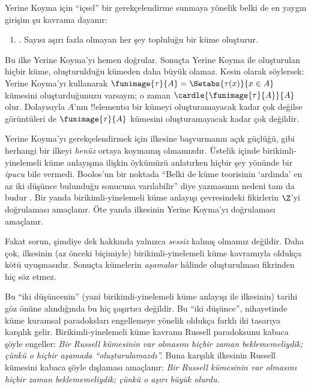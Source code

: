 


Yerine Koyma için ``içsel'' bir gerekçelendirme sunmaya yönelik belki de en
yaygın girişim şu kavrama dayanır:
\begin{enumerate}
	\item[] \limofsize. Sayısı aşırı fazla olmayan her şey topluluğu bir küme
	oluşturur.
\end{enumerate}
Bu ilke Yerine Koyma'yı hemen doğrular. Sonuçta Yerine Koyma ile oluşturulan
hiçbir küme, oluşturulduğu kümeden daha büyük olamaz. Kesin olarak söylersek:
Yerine Koyma'yı kullanarak $\funimage{\tau}{A} =
\Setabs{\tau(x)}{x \in A}$ kümesini oluşturduğunuzu varsayın; o zaman
$\cardle{\funimage{\tau}{A}}{A}$ olur. Dolayısıyla $A$'nın !!{element}s{}ı bir
kümeyi oluşturamayacak kadar çok değilse görüntüleri de
$\funimage{\tau}{A}$ kümesini oluşturamayacak kadar çok değildir.

Yerine Koyma'yı gerekçelendirmek için \limofsize{} ilkesine başvurmanın açık
güçlüğü, \limofsize{} gibi herhangi bir ilkeyi \emph{henüz} ortaya koymamış
olmamızdır. Üstelik  içinde
birikimli-yinelemeli küme anlayışına ilişkin öykümüzü anlatırken hiçbir şey
\limofsize{} yönünde bir \emph{ipucu} bile vermedi. Boolos'un bir noktada
``Belki de küme teorisinin `ardında' en az iki düşünce bulunduğu sonucuna
varılabilir'' diye yazmasının nedeni tam da budur
\citeyearpar[p.~19]{Boolos1989}. Bir yanda birikimli-yinelemeli küme anlayışı
çevresindeki fikirlerin $\Z$'yi doğrulaması amaçlanır. Öte yanda
\limofsize{} ilkesinin Yerine Koyma'yı doğrulaması amaçlanır.

Fakat sorun, şimdiye dek \limofsize{} hakkında yalnızca \emph{sessiz}
kalmış olmamız değildir. Daha çok, \limofsize{} ilkesinin (az önceki
biçimiyle) birikimli-yinelemeli küme kavramıyla oldukça kötü uyuşmasıdır.
Sonuçta kümelerin \emph{aşamalar} hâlinde oluşturulması fikrinden hiç söz
etmez.

Bu ``iki düşüncenin'' (yani birikimli-yinelemeli küme anlayışı ile
\limofsize{} ilkesinin) tarihi göz önüne alındığında bu hiç şaşırtıcı
değildir. Bu ``iki düşünce'', nihayetinde küme kuramsal paradoksları engellemeye
yönelik oldukça farklı iki tasarıya karşılık gelir. Birikimli-yinelemeli küme
kavramı Russell paradoksunu kabaca şöyle engeller: \emph{Bir Russell
kümesinin var olmasını hiçbir zaman beklememeliydik; çünkü o hiçbir aşamada
``oluşturulamazdı''.} Buna karşılık \limofsize{} ilkesinin Russell kümesini
kabaca şöyle dışlaması amaçlanır: \emph{Bir Russell kümesinin var olmasını
hiçbir zaman beklememeliydik; çünkü o aşırı büyük olurdu.}

